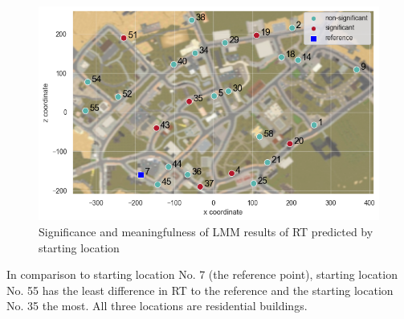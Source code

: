 \begin{figure}[!htb]
	\centering
	\includegraphics[width=150mm]{figures/significance_starting_locations_RT_map_23.png}
	\caption[Significance and meaningfulness (RT predicted by starting location)]{Significance and meaningfulness of LMM results of RT predicted by starting location}
	\label{fig:sig_RT_loc_map}
\end{figure}

In comparison to starting location No. 7 (the reference point), starting location No. 55 has the least difference in RT to the reference and the starting location No. 35 the most. All three locations are residential buildings.
